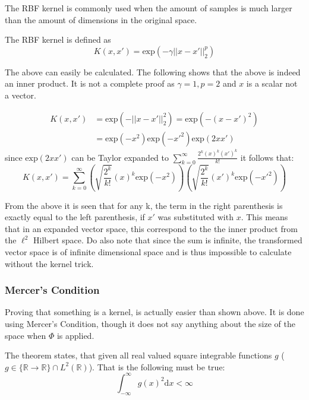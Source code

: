 The RBF kernel is commonly used when the amount of samples is much larger than the amount of dimensions in the original space.

The RBF kernel is defined as
\begin{equation}
K(x,x')=\mathrm{exp}(-\gamma ||x-x'||^p_2)
\end{equation}

The above can easily be calculated. The following shows that the above is indeed an inner product. It is not a complete proof as $\gamma=1, p=2$ and $x$ is a scalar not a vector.

\begin{equation}
\begin{split}
	K(x,x')&=\mathrm{exp}(- ||x-x'||^2_2)=\mathrm{exp}(- (x-x')^2) \\
		  &= \mathrm{exp}(-x^2) \mathrm{exp}(-{x'}^2) \mathrm{exp}(2 x x')
\end{split}
\end{equation}
since $\mathrm{exp}(2 x x')$ can be Taylor expanded to $\sum_{k=0}^\infty \frac{2^k(x)^k (x')^k}{k!}$ it follows that:
\begin{equation}
K(x,x') = \sum_{k=0}^\infty \left(\sqrt{\frac{2^k}{k!}} (x)^k \mathrm{exp}(-x^2)\right)\left(\sqrt{\frac{2^k}{k!}} (x')^k \mathrm{exp}(-{x'}^2)\right)
\end{equation}

From the above it is seen that for any k, the term in the right parenthesis is exactly equal to the left parenthesis, if $x'$ was substituted with $x$. This means that in an expanded vector space, this correspond to the the inner product from the $\ell^2$ Hilbert space. Do also note that since the sum is infinite, the transformed vector space is of infinite dimensional space and is thus impossible to calculate without the kernel trick.

\subsubsection{Mercer's Condition}
Proving that something is a kernel, is actually easier than shown above. It is done using Mercer's Condition, though it does not say anything about the size of the space when $\Phi$ is applied.

The theorem states, that given all real valued square integrable functions $g$ (${g \in \{\mathbb{R} \rightarrow \mathbb{R}\} \cap L^2(\mathbb{R})}$). That is the following must be true:
\begin{equation}
\int_{-\infty}^{\infty} g(x)^2 \mathrm{d}x < \infty
\end{equation}

